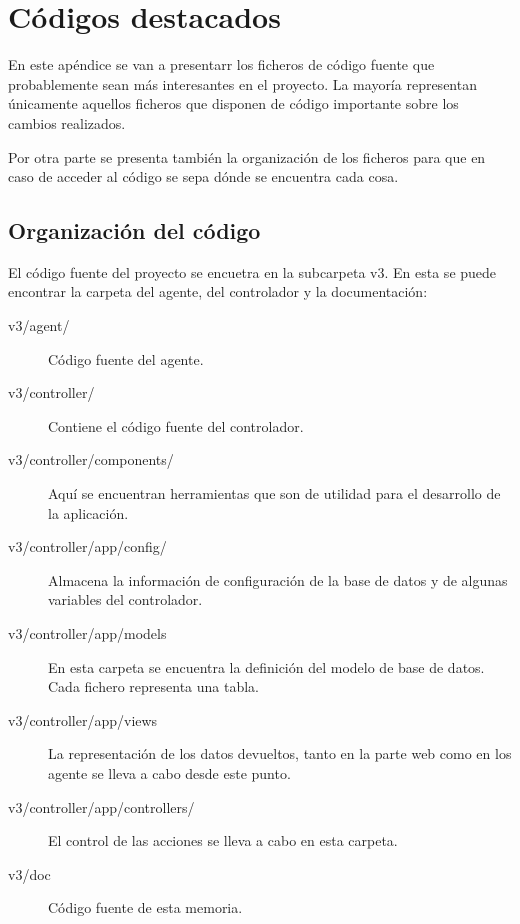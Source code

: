 \chapter{Códigos destacados} 

En este apéndice se van a presentarr los ficheros de código fuente que probablemente sean más interesantes en el proyecto. La mayoría representan únicamente aquellos ficheros que disponen de código importante sobre los cambios realizados.

Por otra parte se presenta también la organización de los ficheros para que en caso de acceder al código se sepa dónde se encuentra cada cosa.

\section{Organización del código}

El código fuente del proyecto se encuetra en la subcarpeta v3. En esta se puede encontrar la carpeta del agente, del controlador y la documentación:

\begin{description}
	\item[v3/agent/] Código fuente del agente.

	\item[v3/controller/] Contiene el código fuente del controlador.
	
	\item[v3/controller/components/] Aquí se encuentran herramientas que son de utilidad para el desarrollo de la aplicación.

	\item[v3/controller/app/config/] Almacena la información de configuración de la base de datos y de algunas variables del controlador.

	\item[v3/controller/app/models] En esta carpeta se encuentra la definición del modelo de base de datos. Cada fichero representa una tabla.

	\item[v3/controller/app/views] La representación de los datos devueltos, tanto en la parte web como en los agente se lleva a cabo desde este punto.

	\item[v3/controller/app/controllers/] El control de las acciones se lleva a cabo en esta carpeta.

	\item[v3/doc] Código fuente de esta memoria.
\end{description}

